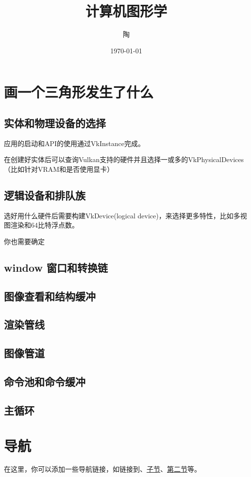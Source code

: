\documentclass{ctexart}
\title{计算机图形学}
\author{陶}
\date{\today}
\begin{document}
\maketitle
\tableofcontents

\section{画一个三角形发生了什么}
\label{sec:first}
\subsection{实体和物理设备的选择}
应用的启动和API的使用通过VkInstance完成。

在创建好实体后可以查询Vulkan支持的硬件并且选择一或多的VkPhysicalDevices（比如针对VRAM和是否使用显卡）

\subsection{逻辑设备和排队族}
选好用什么硬件后需要构建VkDevice(logical device)，来选择更多特性，比如多视图渲染和64比特浮点数。

你也需要确定


\subsection{window 窗口和转换链}
\subsection{图像查看和结构缓冲}
\subsection{渲染管线}
\subsection{图像管道}
\subsection{命令池和命令缓冲}
\subsection{主循环}


\clearpage

\section*{导航}
\label{sec:navigation}

在这里，你可以添加一些导航链接，如链接到、\hyperref[subsec:sub]{子节}、\hyperref[sec:second]{第二节}等。
\end{document}
